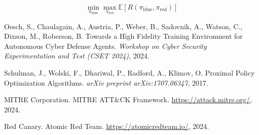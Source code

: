 \documentclass[12pt,a4paper]{article}
\begin{document}
\begin{equation}
\min_{\pi_{\text{blue}}} \max_{\pi_{\text{red}}} \mathbb{E}[R(\pi_{\text{blue}}, \pi_{\text{red}})]
\end{equation}


\begin{thebibliography}{9}

Oesch, S., Chaulagain, A., Austria, P., Weber, B., Sadovnik, A., Watson, C., Dixson, M., Roberson, B.
\newblock Towards a High Fidelity Training Environment for Autonomous Cyber Defense Agents.
\newblock \emph{Workshop on Cyber Security Experimentation and Test (CSET 2024)}, 2024.

Schulman, J., Wolski, F., Dhariwal, P., Radford, A., Klimov, O.
\newblock Proximal Policy Optimization Algorithms.
\newblock \emph{arXiv preprint arXiv:1707.06347}, 2017.

MITRE Corporation.
\newblock MITRE ATT\&CK Framework.
\newblock \url{https://attack.mitre.org/}, 2024.

Red Canary.
\newblock Atomic Red Team.
\newblock \url{https://atomicredteam.io/}, 2024.

\end{thebibliography}
\end{document}
